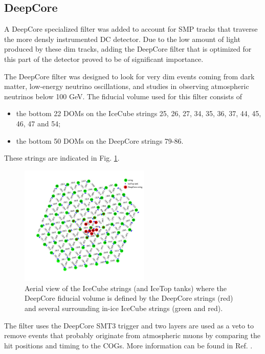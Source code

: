 \subsection{DeepCore}
A DeepCore specialized filter was added to account for SMP tracks that traverse the more densly instrumented DC detector. Due to the low amount of light produced by these dim tracks, adding the DeepCore filter that is optimized for this part of the detector proved to be of significant importance.

The DeepCore filter was designed to look for very dim events coming from dark matter, low-energy neutrino oscillations, and studies in observing atmospheric neutrinos below 100 GeV. The fiducial volume used for this filter consists of
\vspace{2mm}
\begin{itemize}
\item the bottom 22 DOMs on the IceCube strings 25, 26, 27, 34, 35, 36, 37, 44, 45, 46, 47 and 54;
\item the bottom 50 DOMs on the DeepCore strings 79-86.
\end{itemize}
\vspace{2mm}
These strings are indicated in Fig. \ref{fig:deepcorestrings}.\\

\begin{figure}[t]
\centering
\includegraphics[width=0.55\textwidth]{chapter8/img/stringview.jpg}
\caption{Aerial view of the IceCube strings (and IceTop tanks) where the DeepCore fiducial volume is defined by the DeepCore strings (red) and several surrounding in-ice IceCube strings (green and red).}
\label{fig:deepcorestrings}
\end{figure}

\noindent The filter uses the DeepCore SMT3 trigger and two layers are used as a veto to remove events that probably originate from atmospheric muons by comparing the hit positions and timing to the COGs. More information can be found in Ref. \cite{DeepCore2012}.

